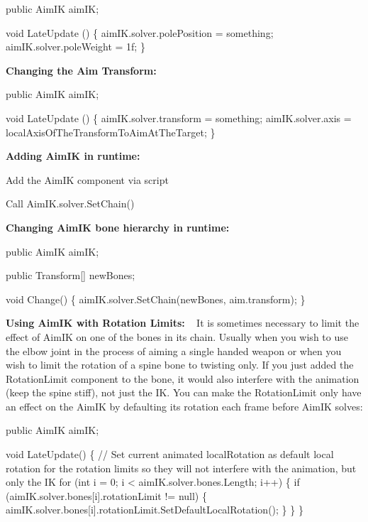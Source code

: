 \begin{DoxyCode}
\textcolor{keyword}{public} AimIK aimIK;

\textcolor{keywordtype}{void} LateUpdate () \{
    aimIK.solver.polePosition = something;
    aimIK.solver.poleWeight = 1f;
\}
\end{DoxyCode}


{\bfseries Changing the Aim Transform\+:}


\begin{DoxyCode}
\textcolor{keyword}{public} AimIK aimIK;

\textcolor{keywordtype}{void} LateUpdate () \{
    aimIK.solver.transform = something;
    aimIK.solver.axis = localAxisOfTheTransformToAimAtTheTarget;
\}
\end{DoxyCode}


{\bfseries Adding Aim\+IK in runtime\+:}
\begin{DoxyItemize}
\item Add the Aim\+IK component via script
\item Call Aim\+I\+K.\+solver.\+Set\+Chain()
\end{DoxyItemize}

{\bfseries Changing Aim\+IK bone hierarchy in runtime\+:} 
\begin{DoxyCode}
\textcolor{keyword}{public} AimIK aimIK;

\textcolor{keyword}{public} Transform[] newBones;

\textcolor{keywordtype}{void} Change() \{
    aimIK.solver.SetChain(newBones, aim.transform);
\}
\end{DoxyCode}


{\bfseries Using Aim\+IK with Rotation Limits\+:} ~\newline
 It is sometimes necessary to limit the effect of Aim\+IK on one of the bones in it\textquotesingle{}s chain. Usually when you wish to use the elbow joint in the process of aiming a single handed weapon or when you wish to limit the rotation of a spine bone to twisting only. If you just added the Rotation\+Limit component to the bone, it would also interfere with the animation (keep the spine stiff), not just the IK. You can make the Rotation\+Limit only have an effect on the Aim\+IK by defaulting it\textquotesingle{}s rotation each frame before Aim\+IK solves\+:


\begin{DoxyCode}
\textcolor{keyword}{public} AimIK aimIK;

\textcolor{keywordtype}{void} LateUpdate() \{
    \textcolor{comment}{// Set current animated localRotation as default local rotation for the rotation limits so they will
       not interfere with the animation, but only the IK}
    \textcolor{keywordflow}{for} (\textcolor{keywordtype}{int} i = 0; i < aimIK.solver.bones.Length; i++) \{
        \textcolor{keywordflow}{if} (aimIK.solver.bones[i].rotationLimit != null) \{
            aimIK.solver.bones[i].rotationLimit.SetDefaultLocalRotation();
        \}
    \}
\}
\end{DoxyCode}


